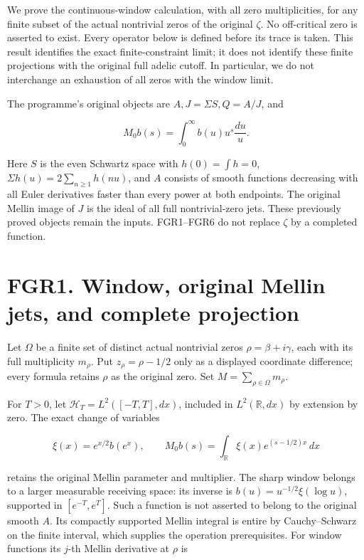 We prove the continuous-window calculation, with all zero
multiplicities, for any finite subset of the actual nontrivial zeros of
the original \(\zeta\). No off-critical zero is asserted to exist. Every
operator below is defined before its trace is taken. This result
identifies the exact finite-constraint limit; it does not identify these
finite projections with the original full adelic cutoff. In particular,
we do not interchange an exhaustion of all zeros with the window limit.

The programme's original objects are \(A,J=\Sigma S,Q=A/J\), and

\[
 M_0b(s)=\int_0^\infty b(u)u^s\frac{du}{u}.
\]

Here \(S\) is the even Schwartz space with \(h(0)=\int h=0\),
\(\Sigma h(u)=2\sum_{n\geq1}h(nu)\), and \(A\) consists of smooth
functions decreasing with all Euler derivatives faster than every power
at both endpoints. The original Mellin image of \(J\) is the ideal of
all full nontrivial-zero jets. These previously proved objects remain
the inputs. FGR1--FGR6 do not replace \(\zeta\) by a completed function.

\section{FGR1. Window, original Mellin jets, and complete
projection}\label{fgr1.-window-original-mellin-jets-and-complete-projection}

Let \(\Omega\) be a finite set of distinct actual nontrivial zeros
\(\rho=\beta+i\gamma\), each with its full multiplicity \(m_\rho\). Put
\(z_\rho=\rho-1/2\) only as a displayed coordinate difference; every
formula retains \(\rho\) as the original zero. Set
\(M=\sum_{\rho\in\Omega}m_\rho\).

For \(T>0\), let \(\mathscr H_T=L^2([-T,T],dx)\), included in
\(L^2(\mathbb R,dx)\) by extension by zero. The exact change of
variables

\[
 \xi(x)=e^{x/2}b(e^x),\qquad
 M_0b(s)=\int_{\mathbb R}\xi(x)e^{(s-1/2)x}\,dx
\tag{FGR1.1}
\]

retains the original Mellin parameter and multiplier. The sharp window
belongs to a larger measurable receiving space: its inverse is
\(b(u)=u^{-1/2}\xi(\log u)\), supported in \([e^{-T},e^T]\). Such a
function is not asserted to belong to the original smooth \(A\). Its
compactly supported Mellin integral is entire by Cauchy--Schwarz on the
finite interval, which supplies the operation prerequisites. For window
functions its \(j\)-th Mellin derivative at \(\rho\) is

